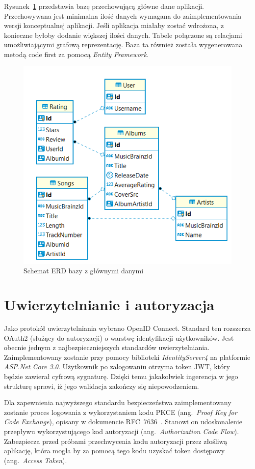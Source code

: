 	Rysunek~\ref{fig:erdRe} przedstawia bazę przechowującą główne dane aplikacji.
	Przechowywana jest minimalna ilość danych wymagana do zaimplementowania wersji konceptualnej aplikacji.
	Jeśli aplikacja miałaby zostać wdrożona, z konieczne byłoby dodanie większej ilości danych.
	Tabele połączone są relacjami umożliwiającymi grafową reprezentację.
	Baza ta również została wygenerowana metodą code first za pomocą \emph{Entity Framework}.

	\begin{figure}[ht]
		\centering
			\includegraphics[width=0.5\linewidth]{rys03/erdRe.png}
		 \caption{Schemat ERD bazy z głównymi danymi}
		 \label{fig:erdRe}
	\end{figure}

\section{Uwierzytelnianie i autoryzacja}
	Jako protokół uwierzytelniania wybrano OpenID Connect.
	Standard ten rozszerza OAuth2 (służący do autoryzacji) o warstwę identyfikacji użytkowników.
	Jest obecnie jednym z najbezpieczniejszych standardów uwierzytelniania.
	Zaimplementowany zostanie przy pomocy biblioteki \emph{IdentityServer4} na platformie \emph{ASP.Net Core 3.0}.
	Użytkownik po zalogowaniu otrzyma token JWT, który będzie zawierał cyfrową sygnaturę.
	Dzięki temu jakakolwiek ingerencja w jego strukturę sprawi, iż jego walidacja zakończy się niepowodzeniem.

	Dla zapewnienia najwyższego standardu bezpieczeństwa zaimplementowany zostanie proces logowania z wykorzystaniem kodu PKCE (ang.\ \emph{Proof Key for Code Exchange}),
	opisany w dokumencie RFC~7636~\cite{PKCE}.
	Stanowi on udoskonalenie przepływu wykorzystującego kod autoryzacji (ang.\ \emph{Authorization Code Flow}).
	Zabezpiecza przed próbami przechwycenia kodu autoryzacji przez złośliwą aplikację,
	która mogła by za pomocą tego kodu uzyskać token dostępowy (ang.\ \emph{Access Token}).
	
